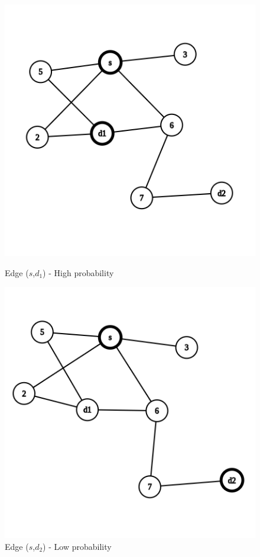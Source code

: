 \documentclass{article}
\begin{document}
\begin{figure}[!htb]
  \includegraphics[width=\linewidth]{graph_random_walk_d2.png}
  \caption{Edge ($s$,$d_1$) -  High probability}\label{fig:awesome_image1}
\endminipage\hfill
{}
  \includegraphics[width=\linewidth]{graph_random_walk_d1.png}
  \caption{Edge ($s$,$d_2$) -  Low probability}\label{fig:awesome_image2}
\endminipage\hfill
\end{figure}
\end{document}
